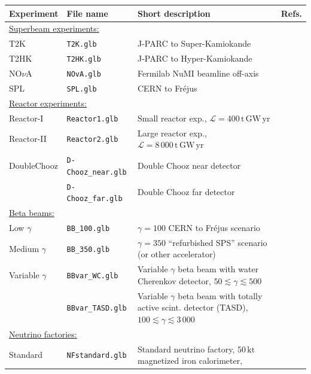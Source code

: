 \documentclass[12pt,a4paper]{article}
\newcommand{\Refs}{Refs.}
\begin{document}
\begin{table}[t!]
{\small
\begin{center}
\begin{tabular}{llp{7.0cm}c}
\hline
Experiment & File name & Short description &  \Refs \\
\hline 
\multicolumn{4}{l}{\underline{Superbeam experiments:}} \\
T2K & {\tt T2K.glb} & J-PARC to Super-Kamiokande &  \cite{Itow:2001ee,Huber:2002mx} \\
T2HK & {\tt T2HK.glb} & J-PARC to Hyper-Kamiokande &  \cite{Itow:2001ee,Huber:2002mx} \\
NO$\nu$A & {\tt NOvA.glb} & Fermilab NuMI beamline off-axis  & \cite{Ambats:2004js,Yang_2004} \\
SPL & {\tt SPL.glb} & CERN to Fr\'{e}jus & \cite{Campagne:2006yx,Campagne:2004wt,Mezzetto:2003mm} \\[0.2cm]
\multicolumn{4}{l}{\underline{Reactor experiments:}} \\
{\sc Reactor-I} & {\tt Reactor1.glb} & Small reactor exp., 
$\mathcal{L} = 400 \, \mathrm{t} \, \mathrm{GW} \, \mathrm{yr}$
& \cite{Huber:2003pm} \\
{\sc Reactor-II} & {\tt Reactor2.glb} & Large reactor exp., 
$\mathcal{L} = 8\, 000 \, \mathrm{t} \, \mathrm{GW} \, \mathrm{yr}$ 
& \cite{Huber:2003pm} \\
Double{\sc Chooz} & {\tt D-Chooz\_near.glb} & Double Chooz near 
detector & \cite{Huber:2006vr} \\ 
 & {\tt D-Chooz\_far.glb} & Double Chooz far detector & \\[0.2cm]
\multicolumn{4}{l}{\underline{Beta beams:}} \\
Low $\gamma$ & {\tt BB\_100.glb} & $\gamma=100$ CERN to Fr\'{e}jus 
scenario & \cite{Campagne:2006yx} \\
Medium $\gamma$ & {\tt BB\_350.glb} & $\gamma=350$ ``refurbished SPS'' scenario (or other accelerator)
& \cite{Burguet-Castell:2005pa} \\
Variable $\gamma$ & {\tt BBvar\_WC.glb} & Variable $\gamma$ beta beam with water Cherenkov detector, $50 \lesssim \gamma \lesssim 500$ & \cite{Huber:2005jk} \\[0.2cm]
	& {\tt BBvar\_TASD.glb} & Variable $\gamma$ beta beam with totally active scint. detector (TASD), 
$100 \lesssim \gamma \lesssim 3\, 000$ & \cite{Huber:2005jk} \\[0.4cm]
\multicolumn{4}{l}{\underline{Neutrino factories:}} \\
Standard & {\tt NFstandard.glb} & Standard neutrino factory, $50 \, \mathrm{kt}$ magnetized iron calorimeter, 

\end{tabular}
\end{center}}
\end{table}
\end{document}

